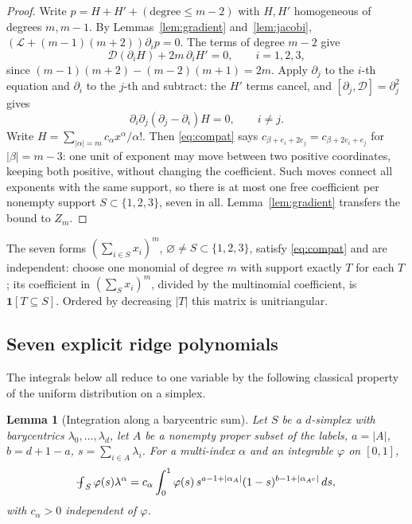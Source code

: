 \documentclass[11pt,a4paper]{article}
\newtheorem{lemma}[theorem]{Lemma}
\theoremstyle{definition}
\theoremstyle{remark}
\newcommand{\avg}{\mathop{\mathchoice{{\textstyle\int}\mkern-15.5mu{-}\mkern2mu}{\int\mkern-12mu{-}\mkern1mu}{\int\mkern-11mu{-}}{\int\mkern-11mu{-}}}\nolimits}
\begin{document}
\begin{proof}
Write \(p=H+H'+(\text{degree}\le m-2)\) with \(H,H'\) homogeneous of
degrees \(m,m-1\). By Lemmas~\ref{lem:gradient} and~\ref{lem:jacobi},
\((\mathcal L+(m-1)(m+2))\partial_ip=0\). The terms of degree \(m-2\) give
\begin{equation}
 \mathcal D(\partial_iH)+2m\,\partial_iH'=0,\qquad i=1,2,3,
 \label{eq:nextdeg}
\end{equation}
since \((m-1)(m+2)-(m-2)(m+1)=2m\). Apply \(\partial_j\) to the \(i\)-th
equation and \(\partial_i\) to the \(j\)-th and subtract: the \(H'\) terms
cancel, and \([\partial_j,\mathcal D]=\partial_j^2\) gives
\begin{equation}
 \partial_i\partial_j(\partial_j-\partial_i)H=0,\qquad i\ne j.
 \label{eq:compat}
\end{equation}
Write \(H=\sum_{|\alpha|=m}c_\alpha x^\alpha/\alpha!\). Then
\eqref{eq:compat} says \(c_{\beta+e_i+2e_j}=c_{\beta+2e_i+e_j}\) for
\(|\beta|=m-3\): one unit of exponent may move between two positive
coordinates, keeping both positive, without changing the coefficient.
Such moves connect all exponents with the same support, so there is at
most one free coefficient per nonempty support \(S\subset\{1,2,3\}\), seven
in all. Lemma~\ref{lem:gradient} transfers the bound to \(Z_m\).
\end{proof}

The seven forms \((\sum_{i\in S}x_i)^m\), \(\varnothing\ne S\subset\{1,2,3\}\),
satisfy \eqref{eq:compat} and are independent: choose one monomial of
degree \(m\) with support exactly \(T\) for each \(T\); its coefficient in
\((\sum_{S}x_i)^m\), divided by the multinomial coefficient, is
\(\mathbf 1[T\subseteq S]\). Ordered by decreasing \(|T|\) this matrix is
unitriangular.

\subsection{Seven explicit ridge polynomials}

The integrals below all reduce to one variable by the following
classical property of the uniform distribution on a simplex.

\begin{lemma}[Integration along a barycentric sum]
\label{lem:aggregation}
Let \(S\) be a \(d\)-simplex with barycentrics \(\lambda_0,\dots,\lambda_d\),
let \(A\) be a nonempty proper subset of the labels, \(a=|A|\),
\(b=d+1-a\), \(s=\sum_{i\in A}\lambda_i\). For a multi-index \(\alpha\) and
an integrable \(\varphi\) on \([0,1]\),
\[
 \avg_S\varphi(s)\lambda^\alpha
 =c_\alpha\int_0^1\varphi(s)\,s^{a-1+|\alpha_A|}(1-s)^{b-1+|\alpha_{A^c}|}\,ds,
\]
with \(c_\alpha>0\) independent of \(\varphi\).
\end{lemma}
\end{document}
